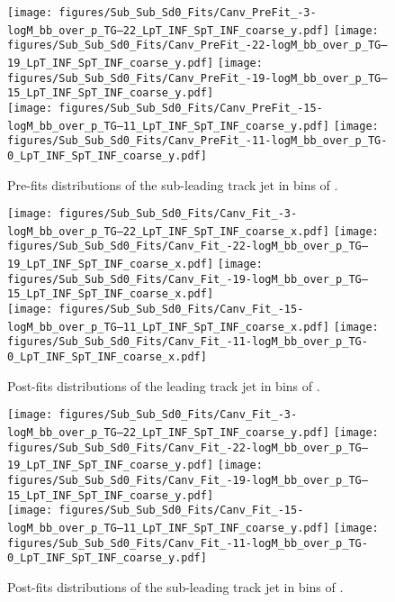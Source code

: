 \begin{figure}[htbp]
  \centering
 \texttt{[image: figures/Sub\_Sub\_Sd0\_Fits/Canv\_PreFit\_-3-logM\_bb\_over\_p\_TG--22\_LpT\_INF\_SpT\_INF\_coarse\_y.pdf]}
 \texttt{[image: figures/Sub\_Sub\_Sd0\_Fits/Canv\_PreFit\_-22-logM\_bb\_over\_p\_TG--19\_LpT\_INF\_SpT\_INF\_coarse\_y.pdf]}
 \texttt{[image: figures/Sub\_Sub\_Sd0\_Fits/Canv\_PreFit\_-19-logM\_bb\_over\_p\_TG--15\_LpT\_INF\_SpT\_INF\_coarse\_y.pdf]}\\
 \texttt{[image: figures/Sub\_Sub\_Sd0\_Fits/Canv\_PreFit\_-15-logM\_bb\_over\_p\_TG--11\_LpT\_INF\_SpT\_INF\_coarse\_y.pdf]}
 \texttt{[image: figures/Sub\_Sub\_Sd0\_Fits/Canv\_PreFit\_-11-logM\_bb\_over\_p\_TG-0\_LpT\_INF\_SpT\_INF\_coarse\_y.pdf]}

\caption{Pre-fits \subsdzero distributions of the sub-leading track jet in bins of \mpt. }
  \label{fig:fracmasspt-prefits-subleading-subsub}
\end{figure}

\begin{figure}[htbp]
  \centering
 \texttt{[image: figures/Sub\_Sub\_Sd0\_Fits/Canv\_Fit\_-3-logM\_bb\_over\_p\_TG--22\_LpT\_INF\_SpT\_INF\_coarse\_x.pdf]}
 \texttt{[image: figures/Sub\_Sub\_Sd0\_Fits/Canv\_Fit\_-22-logM\_bb\_over\_p\_TG--19\_LpT\_INF\_SpT\_INF\_coarse\_x.pdf]}
 \texttt{[image: figures/Sub\_Sub\_Sd0\_Fits/Canv\_Fit\_-19-logM\_bb\_over\_p\_TG--15\_LpT\_INF\_SpT\_INF\_coarse\_x.pdf]}\\
 \texttt{[image: figures/Sub\_Sub\_Sd0\_Fits/Canv\_Fit\_-15-logM\_bb\_over\_p\_TG--11\_LpT\_INF\_SpT\_INF\_coarse\_x.pdf]}
 \texttt{[image: figures/Sub\_Sub\_Sd0\_Fits/Canv\_Fit\_-11-logM\_bb\_over\_p\_TG-0\_LpT\_INF\_SpT\_INF\_coarse\_x.pdf]}


\caption{Post-fits \subsdzero distributions of the leading track jet in bins of \mpt. }
  \label{fig:fracmasspt-postfits-leading-subsub}
\end{figure}


\begin{figure}[htbp]
  \centering
 \texttt{[image: figures/Sub\_Sub\_Sd0\_Fits/Canv\_Fit\_-3-logM\_bb\_over\_p\_TG--22\_LpT\_INF\_SpT\_INF\_coarse\_y.pdf]}
 \texttt{[image: figures/Sub\_Sub\_Sd0\_Fits/Canv\_Fit\_-22-logM\_bb\_over\_p\_TG--19\_LpT\_INF\_SpT\_INF\_coarse\_y.pdf]}
 \texttt{[image: figures/Sub\_Sub\_Sd0\_Fits/Canv\_Fit\_-19-logM\_bb\_over\_p\_TG--15\_LpT\_INF\_SpT\_INF\_coarse\_y.pdf]}\\
 \texttt{[image: figures/Sub\_Sub\_Sd0\_Fits/Canv\_Fit\_-15-logM\_bb\_over\_p\_TG--11\_LpT\_INF\_SpT\_INF\_coarse\_y.pdf]}
 \texttt{[image: figures/Sub\_Sub\_Sd0\_Fits/Canv\_Fit\_-11-logM\_bb\_over\_p\_TG-0\_LpT\_INF\_SpT\_INF\_coarse\_y.pdf]}

\caption{Post-fits \subsdzero distributions of the sub-leading track jet in bins of \mpt. }
  \label{fig:fracmasspt-postfits-subleading-subsub}
\end{figure}



